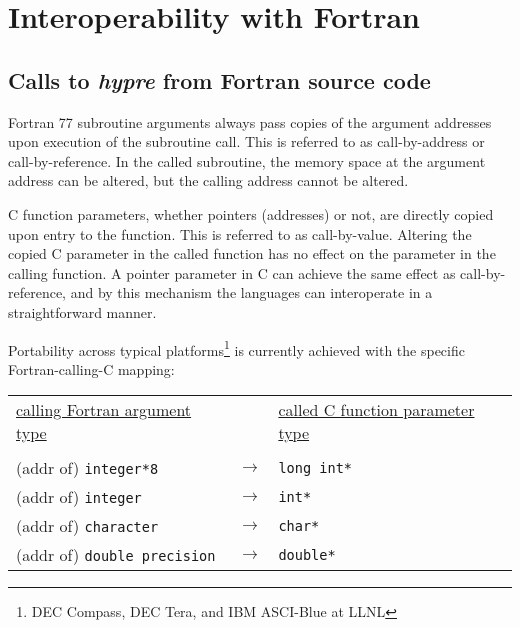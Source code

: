 \chapter{Interoperability with Fortran}

\section{Calls to {\slshape hypre} from Fortran source code}

Fortran 77 subroutine arguments always pass copies of the argument addresses
upon execution of the subroutine call.
This is referred to as call-by-address or call-by-reference.
In the called subroutine, the memory space at the
argument address can be altered, but the calling address cannot be
altered.

C function parameters, whether pointers (addresses) or not, are
directly copied upon
entry to the function. This is referred to as call-by-value.
Altering the copied C parameter in the
called function has no effect on the parameter in the calling function. 
A pointer parameter in C can achieve the same effect as call-by-reference,
and by this mechanism the languages can interoperate in a straightforward
manner.

Portability across typical platforms\footnote{DEC Compass, DEC Tera, and IBM ASCI-Blue at LLNL}
is currently achieved with the specific Fortran-calling-C mapping: 

\vspace{0.2in}

\begin{tabular}{lcl}

\underline{calling Fortran argument type} & &
\underline{called C function parameter type} \\
                              &                   &   \\
\hspace{0.1in} (addr of) \verb+integer*8+        & $\longrightarrow$ &
\hspace{0.5in} \verb+long int*+ \\
\hspace{0.1in} (addr of) \verb+integer+          & $\longrightarrow$ &
\hspace{0.5in} \verb+int*+ \\
\hspace{0.1in} (addr of) \verb+character+        & $\longrightarrow$ &
\hspace{0.5in} \verb+char*+ \\
\hspace{0.1in} (addr of) \verb+double precision+ & $\longrightarrow$ &
\hspace{0.5in} \verb+double*+ \\

\end{tabular}

